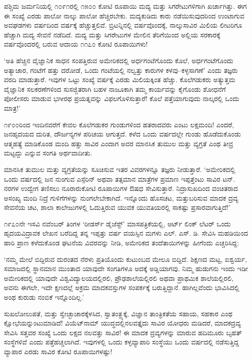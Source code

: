 ಪಶ್ಚಿಮ ಜರ್ಮನಿಯಲ್ಲಿ ೧೦೯೧ರಲ್ಲಿ ೧೫೦೦ ಕೋಟಿ ರೂಪಾಯಿ ಮದ್ಯ ಮತ್ತು ಸಿಗರೇಟು\-ಗಳಿಗಾಗಿ ಖರ್ಚಾಗಿತ್ತು. ಈಗ ಈ ಸಂಖ್ಯೆ ಎರಡು ಪಾಲೋ ನಾಲ್ಕು ಪಾಲೋ ಹೆಚ್ಚಿರಬೇಕು. ಮದ್ಯಕುಡಿದು ಕಾರು ನಡೆಯಿಸುವುದರಿಂದ ಉಂಟಾಗುವ ಅವಘಡಗಳು ವರ್ಷದಿಂದ ವರ್ಷಕ್ಕೆ ಹೆಚ್ಚುತ್ತಲಿವೆ. ಬ್ರಿಟನ್ನಿನಲ್ಲಿ ವರ್ಷವೊಂದಕ್ಕೆ, ನಾಲ್ಕುಸಾವಿರ ಮಿಲಿಯ ಲೀಟರಿಗೂ ಹೆಚ್ಚಾಗಿ ಮದ್ಯ ಸೇವನೆ ನಡೆದಿದೆ. ಮದ್ಯ ಮತ್ತು ಸಿಗರೇಟುಗಳ ಮೇಲಿನ ತೆರಿಗೆಯಿಂದ ಅಲ್ಲಿಯ ಸರಕಾರಕ್ಕೆ ವರ್ಷವೊಂದರಲ್ಲಿ ಬರುವ ಆದಾಯ ೧೧೭೦ ಕೋಟಿ ರೂಪಾಯಿಗಳು!

‘ಅತಿ ಹೆಚ್ಚಿನ ವೈಜ್ಞಾನಿಕ ಸಾಧನ ಸಂಪತ್ತಿರುವ ಅಮೇರಿಕದಲ್ಲಿ ಅರ್ಧಗಂಟೆಗೊಂದು ಕೊಲೆ, ಅರ್ಧಗಂಟೆಗೊಂದು ಅತ್ಯಾಚಾರ, ಗಂಟೆಗೆ ಹತ್ತು ದರೋಡೆ, ಒಂದು ಗಂಟೆಯಲ್ಲಿ ನಲ್ವತ್ತು ಕಾರುಗಳ ಕಳವು–ಕಳ್ಳಸಾಗಣೆ’ ಎಂದು ತಜ್ಞರು ವರದಿ ಮಾಡುತ್ತಾರೆ. ಇವುಗಳ ಒಟ್ಟು ಸಂಖ್ಯೆ ವರ್ಷಕ್ಕೆ ಎರಡು ಮಿಲಿಯಕ್ಕಿಂತ ಹೆಚ್ಚು. ಕೊಲೆಗಡುಕರು ಅತ್ಯುತ್ತಮ ವೈಜ್ಞಾನಿಕ ಸಲಕರಣೆಗಳಿಂದ ಸುಸಜ್ಜಿತರಾಗಿ ಬಹಳ ನಾಜೂಕಾಗಿ ತಮ್ಮ ಕಾರ್ಯವನ್ನು ಕೈಗೊಂಡು ಶೋಧನೆಗೆ ಪೋಲೀಸರು ಮಾಡುವ ಭಗೀರಥ ಪ್ರಯತ್ನವನ್ನು ವಿಫಲಗೊಳಿಸುತ್ತಾರೆ! ಕೊಲೆ ಪತ್ತೆಯಾಗುವುದು ನಾಲ್ಕರಲ್ಲಿ ಒಂದು ಮಾತ್ರ!’

೧೯೦೦ರಿಂದ ಇಂದಿನವರೆಗೆ ಕೇವಲ ಕೊಲೆಗಡುಕರ ಗುಂಡುಗಳಿಂದ ಹತರಾದವರು ಎಂಟು ಲಕ್ಷಮಂದಿ! ಎಂದರೆ, ಜನಹೃದಯದ ದುರಿತ, ದೌರ್ಜನ್ಯಗಳ ಪರಿಚಯ ಆಗುತ್ತದೆ. ಕಳೆದ ಒಂದು ವರ್ಷದಲ್ಲೇ ಗುಂಡು ಹೊಡೆದುಕೊಂಡು ಆತ್ಮಹತ್ಯೆ ಮಾಡಿಕೊಂಡ ಮಂದಿ ಹತ್ತು ಸಾವಿರ ಎಂದಾಗ ಅವರ ಮಾನಸಿಕ ತುಮುಲ ಮತ್ತು ವ್ಯಗ್ರತೆ ಎಂಥ ತೀವ್ರ ಮಟ್ಟದ್ದು ಎನ್ನುವ ಸಂಗತಿ ಅರ್ಥವಾದೀತು.

ಮಾನಸಿಕ ತುಮುಲ ಮತ್ತು ವ್ಯಗ್ರತೆಯನ್ನು ಸೂಚಿಸುವ ಇತರ ವಿವರಗಳನ್ನೂ ತಜ್ಞರು ನೀಡುತ್ತಾರೆ. ‘ಅಮೇರಿಕದಲ್ಲಿ ಒಂದು ವರ್ಷದಲ್ಲಿ ಜನ ನುಂಗುವ ಎಸ್ಪೆರಿನ್ ಅಥವಾ ತತ್ಸಮಾನ ಮಾತ್ರೆಗಳ ಪ್ರಮಾಣ ಇಪ್ಪತ್ತೆಂಟು ಸಾವಿರ ಟನ್. ನರಗಳ ಉದ್ವೇಗ ತಣಿಸಲು ನೂರಾರುಕೋಟಿ ರೂಪಾಯಿಗಳ ಔಷಧ ಸೇವಿಸುತ್ತಾರೆ. ನಿದ್ರಾಸುಖದಿಂದ ವಂಚಿತರಾದ ಅಸಂಖ್ಯ ಮಂದಿ ನಿದ್ರೆ ಗುಳಿಗೆಗಳನ್ನು ನುಂಗಲೇಬೇಕಾಗಿದೆ. ಇನ್ನೊಂದು ಹೊಸಚಟ, ಮತ್ತುಬರಿಸುವ ಮಾದಕ ದ್ರವ್ಯ ಸೇವನೆಯ ಚಟ, ಶಾಲಾ ಕಾಲೇಜುಗಳಲ್ಲಿ ಓದುತ್ತಿರುವ ಯುವಕ ಯುವತಿಯರಲ್ಲಿ ಸಾಕಷ್ಟು ಪ್ರಸಾರವಾಗುತ್ತಿದೆ!’

೧೯೭೦ನೇ ಇಸವಿ ನವೆಂಬರ್ ತಿಂಗಳ ‘ರೀಡರ್ಸ್ ಡೈಜೆಸ್ಟ್​’ ಮಾಸಪತ್ರಿಕೆಯಲ್ಲಿ, ಆರ್ಟ್ ಲಿಂಕ್ ಲೆಟರ್ ಒಂದು ಹೃದಯವಿದ್ರಾವಕ ಲೇಖನ ಬರೆದಿದ್ದ ತನ್ನ ಇಪ್ಪತ್ತು ವರ್ಷ ವಯಸ್ಸಿನ ಮಗಳು ಎಲ್. ಎಸ್. ಡಿ. ಸೇವಿಸಿ ಮಹಡಿಯಿಂದ ಹಾರಿ ಪ್ರಾಣ ಕಳೆದುಕೊಂಡ ಘಟನೆಯ ವಿವರವನ್ನು ನೀಡಿ, ಅಮೇರಿಕದ ತಂದೆತಾಯಿಗಳನ್ನು ಹೀಗೆಂದು ಎಚ್ಚರಿಸಿದ್ದ:

‘ನಮ್ಮ ಮೇಲೆ ಬಿದ್ದಿರುವ ದುರಂತದ ನೆರಳು ಪ್ರತಿಯೊಂದು ಕುಟುಂಬದ ಮೇಲೂ ಬಿದ್ದಿದೆ. ಶಿಕ್ಷಣದ ಮಟ್ಟ, ಐಶ್ವರ್ಯ, ಸಮಾಜದಲ್ಲಿ ಸ್ಥಾನಮಾನ ಮುಂತಾದ ಯಾವುದೇ ಸಂಗತಿಗಳೂ ಅದಕ್ಕೆ ಅಡ್ಡಿಯಾಗವು. ನಿಮ್ಮ ಹುಡುಗನು ಇಂದು ಇಡೀ ಅಮೇರಿಕದಲ್ಲಿ ಯಾವುದೇ ವಿಶ್ವ\-ವಿದ್ಯಾಲಯ\-ದಲ್ಲಿರಲಿ, ಪ್ರೌಢಶಾಲೆಯಲ್ಲಿರಲಿ ಅಥವಾ ಪ್ರಾಥಮಿಕ ಶಾಲೆಯಲ್ಲಿರಲಿ, ಅವನು ಈಗಲೇ, ಇದೇ ಕ್ಷಣದಲ್ಲೆ ಅಕ್ರಮ ಮಾದಕವಸ್ತುಗಳ ಸಂಪರ್ಕಕ್ಕೆ ಬರುತ್ತಿದ್ದಾನೆ. ಹಾಗಿಲ್ಲವೆಂದು ಭಾವಿಸಿದಲ್ಲಿ ಅಂಥ ಕುರುಡು ನಂಬಿಕೆ ಇನ್ನೊಂದಿಲ್ಲ.’

ಸುಖಲೋಲುಪತೆ, ಮತ್ತು ಸ್ವೇಚ್ಛಾಚಾರಕ್ಕೆಳಸಿದ, ಸ್ವಾತಂತ್ರ್ಯಕ್ಕೆ, ವಿಜ್ಞಾನ ತಾಂತ್ರಿಕತೆಯ ಸಹಾಯ, ಸಹಕಾರ ಎಂಥ ಕ್ಷೋಭೆಯನ್ನುಂಟುಮಾಡಿದೆ! ವಿಯೆಟ್​ನಾಮ್ ಯುದ್ಧದಲ್ಲಿ\break ನಲವತ್ತೈದು ಸಾವಿರ ಯೋಧರು ಮಡಿದರೆ, ಮಾದಕದ್ರವ್ಯ ಸೇವಿಸಿ ಸತ್ತವರ ಸಂಖ್ಯೆ ಒಂದು ಲಕ್ಷದ ನಲವತ್ತು ಸಾವಿರ! ಈ ಮಾದಕ ದ್ರವ್ಯಗಳನ್ನು ಮಾರುವ ಹದಿಮೂರು ಬೃಹತ್ ಸಂಸ್ಥೆಗಳಿವೆ ಎಂದು ಪತ್ತೆಹಚ್ಚಲಾಗಿದೆ. ಇವುಗಳಲ್ಲಿ ಒಂದು ಕಳ್ಳವ್ಯಾಪಾರಿ ಸಂಸ್ಥೆಯು ಒಂದು ವರ್ಷದಲ್ಲಿ ನಡೆಸುತ್ತಿದ್ದ ವ್ಯಾಪಾರ ಎರಡು ಸಾವಿರ ಕೋಟಿ ರೂಪಾಯಿಗಳಷ್ಟು!


